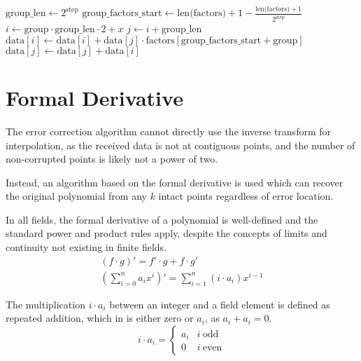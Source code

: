 \begin{algorithm}
    \begin{algorithmic}
                \State $\text{group\_len} \gets 2^\text{step}$
                \State $\text{group\_factors\_start} \gets \text{len(factors)} + 1 - \frac{\text{len(factors)} + 1}{2^{\text{step}}}$
                        \State $i \gets \text{group} \cdot \text{group\_len} \cdot 2 + x$
                        \State $j \gets i + \text{group\_len}$
                        \State $\text{data}[i] \gets \text{data}[i] + \text{data}[j] \cdot \text{factors}[\text{group\_factors\_start} + \text{group}]$
                        \State $\text{data}[j] \gets \text{data}[j] + \text{data}[i]$
                    \EndFor
                \EndFor
            \EndFor
        \EndFunction
    \end{algorithmic}
\end{algorithm}

\section{Formal Derivative}

The error correction algorithm cannot directly use the inverse transform for interpolation, as the received data is not at contiguous points, and the number of non-corrupted points is likely not a power of two.

Instead, an algorithm based on the formal derivative is used which can recover the original polynomial from any $k$ intact points regardless of error location.

In all fields, the formal derivative of a polynomial is well-defined and the standard power and product rules apply, despite the concepts of limits and continuity not existing in finite fields.
\begin{gather*}
(f \cdot g)' = f' \cdot g + f \cdot g'\\
(\sum_{i = 0}^{n} a_i x^i)' = \sum_{i = 1}^{n} (i \cdot a_i) x^{i - 1}
\end{gather*}

The multiplication $i \cdot a_i$ between an integer and a field element is defined as repeated addition, which in  is either zero or $a_i$, as $a_i + a_i = 0$.
\[
i \cdot a_i =
    \begin{cases}
        a_i & i\ \text{odd} \\
        0 & i\ \text{even}
    \end{cases}
\]

